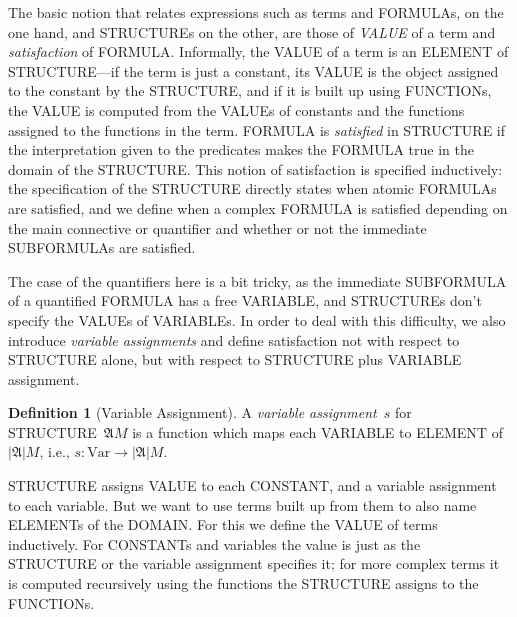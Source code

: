 \documentclass[10pt,a4paper]{article}
\newcommand*{\olup}[1]{\MakeUppercase{#1}}
\theoremstyle{plain}
\theoremstyle{definition}
\newtheorem{defn}[thm]{Definition}
\theoremstyle{remark}
\newenvironment{explain}{}{}
\providecommand{\Struct}{\ensuremath{\mathfrak{A}}}
\providecommand{\Domain}{\ensuremath{|\mathfrak{A}|}}
\providecommand{\Var}{\mathrm{Var}}
\begin{document}
\begin{explain}
The basic notion that relates expressions such as terms and
\olup{formula}s, on the one hand, and \olup{structure}s on the other, are
those of \emph{\olup{value}} of a term and \emph{satisfaction} of 
\olup{formula}.  Informally, the \olup{value} of a term is an \olup{element} of
\olup{structure}---if the term is just a constant, its \olup{value} is the
object assigned to the constant by the \olup{structure}, and if it is
built up using \olup{function}s, the \olup{value} is computed from the
\olup{value}s of constants and the functions assigned to the functions in
the term.  \olup{formula} is \emph{satisfied} in \olup{structure} if the
interpretation given to the predicates makes the \olup{formula} true in
the domain of the \olup{structure}. This notion of satisfaction is
specified inductively: the specification of the \olup{structure} directly
states when atomic \olup{formula}s are satisfied, and we define when a
complex \olup{formula} is satisfied depending on the main connective or
quantifier and whether or not the immediate \olup{subformula}s are
satisfied. 

The case of the quantifiers here is a bit tricky, as the
immediate \olup{subformula} of a quantified \olup{formula} has a free
\olup{variable}, and \olup{structure}s don't specify the \olup{value}s of
\olup{variable}s.  In order to deal with this difficulty, we also
introduce \emph{variable assignments} and define satisfaction not with
respect to \olup{structure} alone, but with respect to \olup{structure}
plus \olup{variable} assignment.
\end{explain}

\begin{defn}[Variable Assignment]
A \emph{variable assignment}~$s$ for \olup{structure}~$\Struct{M}$ is a
function which maps each \olup{variable} to \olup{element} of~$\Domain M$,
i.e., $s\colon \Var \to \Domain M$.
\end{defn}

\begin{explain}
\olup{structure} assigns \olup{value} to each \olup{constant}, and a
variable assignment to each variable.  But we want to use terms built
up from them to also name \olup{element}s of the \olup{domain}.  For this we
define the \olup{value} of terms inductively. For \olup{constant}s and
variables the value is just as the \olup{structure} or the variable
assignment specifies it; for more complex terms it is computed
recursively using the functions the \olup{structure} assigns to the
\olup{function}s.
\end{explain}
\end{document}
